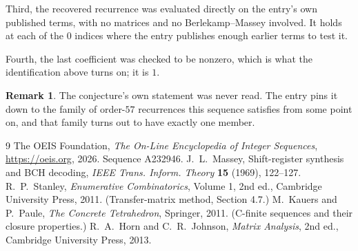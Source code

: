 \documentclass[11pt,a4paper]{article}
\theoremstyle{plain}
\theoremstyle{definition}
\newtheorem{remark}[theorem]{Remark}
\begin{document}
Third, the recovered recurrence was evaluated directly on the entry's own published terms, with
no matrices and no Berlekamp--Massey involved. It holds at each of the $0$ indices where
the entry publishes enough earlier terms to test it.

Fourth, the last coefficient was checked to be nonzero, which is what the identification above
turns on; it is $1$.

\begin{remark}
The conjecture's own statement was never read. The entry pins it down to the family of
order-$57$ recurrences this sequence satisfies from some point on, and that family turns
out to have exactly one member.
\end{remark}

\begin{thebibliography}{9}
 The OEIS Foundation, \emph{The On-Line Encyclopedia of Integer
Sequences}, \url{https://oeis.org}, 2026. Sequence A232946.
 J.~L.~Massey, Shift-register synthesis and BCH decoding, \emph{IEEE
Trans. Inform. Theory} \textbf{15} (1969), 122--127.
 R.~P.~Stanley, \emph{Enumerative Combinatorics}, Volume 1, 2nd ed.,
Cambridge University Press, 2011. (Transfer-matrix method, Section 4.7.)
 M.~Kauers and P.~Paule, \emph{The Concrete Tetrahedron}, Springer, 2011.
(C-finite sequences and their closure properties.)
 R.~A.~Horn and C.~R.~Johnson, \emph{Matrix Analysis}, 2nd ed., Cambridge
University Press, 2013.
\end{thebibliography}
\end{document}
